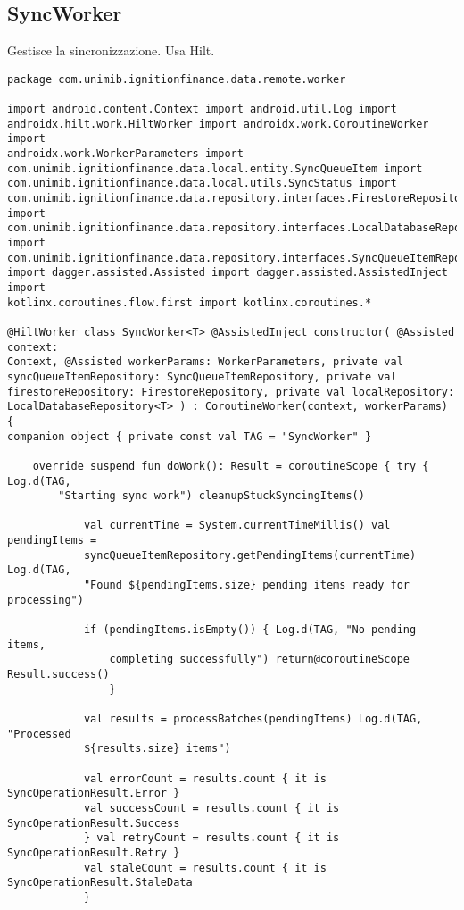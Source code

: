 \subsection{SyncWorker}\label{subsec:syncworker} Gestisce la sincronizzazione.
Usa Hilt.

\begin{lstlisting}[caption=SyncWorker.kt, label=lst:syncworker, basicstyle=\ttfamily\scriptsize, breaklines=true, breakatwhitespace=true, tabsize=4]
package com.unimib.ignitionfinance.data.remote.worker

import android.content.Context import android.util.Log import
androidx.hilt.work.HiltWorker import androidx.work.CoroutineWorker import
androidx.work.WorkerParameters import
com.unimib.ignitionfinance.data.local.entity.SyncQueueItem import
com.unimib.ignitionfinance.data.local.utils.SyncStatus import
com.unimib.ignitionfinance.data.repository.interfaces.FirestoreRepository import
com.unimib.ignitionfinance.data.repository.interfaces.LocalDatabaseRepository
import
com.unimib.ignitionfinance.data.repository.interfaces.SyncQueueItemRepository
import dagger.assisted.Assisted import dagger.assisted.AssistedInject import
kotlinx.coroutines.flow.first import kotlinx.coroutines.*

@HiltWorker class SyncWorker<T> @AssistedInject constructor( @Assisted context:
Context, @Assisted workerParams: WorkerParameters, private val
syncQueueItemRepository: SyncQueueItemRepository, private val
firestoreRepository: FirestoreRepository, private val localRepository:
LocalDatabaseRepository<T> ) : CoroutineWorker(context, workerParams) {
companion object { private const val TAG = "SyncWorker" }

    override suspend fun doWork(): Result = coroutineScope { try { Log.d(TAG,
        "Starting sync work") cleanupStuckSyncingItems()

            val currentTime = System.currentTimeMillis() val pendingItems =
            syncQueueItemRepository.getPendingItems(currentTime) Log.d(TAG,
            "Found ${pendingItems.size} pending items ready for processing")

            if (pendingItems.isEmpty()) { Log.d(TAG, "No pending items,
                completing successfully") return@coroutineScope Result.success()
                }

            val results = processBatches(pendingItems) Log.d(TAG, "Processed
            ${results.size} items")

            val errorCount = results.count { it is SyncOperationResult.Error }
            val successCount = results.count { it is SyncOperationResult.Success
            } val retryCount = results.count { it is SyncOperationResult.Retry }
            val staleCount = results.count { it is SyncOperationResult.StaleData
            }


\end{lstlisting}

